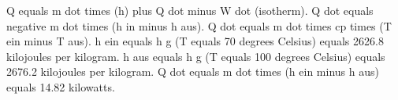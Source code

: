 Q equals m dot times (h) plus Q dot minus W dot (isotherm).  
Q dot equals negative m dot times (h in minus h aus).  
Q dot equals m dot times cp times (T ein minus T aus).  
h ein equals h g (T equals 70 degrees Celsius) equals 2626.8 kilojoules per kilogram.  
h aus equals h g (T equals 100 degrees Celsius) equals 2676.2 kilojoules per kilogram.  
Q dot equals m dot times (h ein minus h aus) equals 14.82 kilowatts.